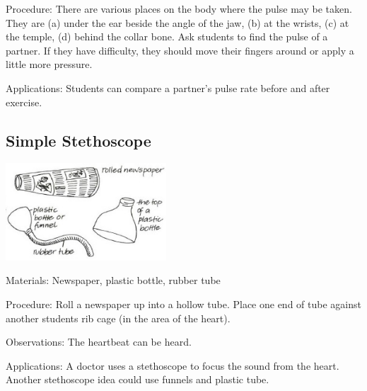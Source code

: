 \begin{multicols}{2}
\begin{description*}
\item[Procedure:]{There are various places on the body where the pulse may be taken.
They are (a) under the ear beside the angle of the jaw, (b) at the wrists,
(c) at the temple, (d) behind the collar bone.
Ask students to find the pulse of a partner. If they have difficulty, they
should move their fingers around or apply a little more pressure.}
\item[Applications:]{Students can compare a partner's pulse rate before and after exercise.}
\end{description*}

\subsection{Simple Stethoscope} %

\begin{center}
\includegraphics[width=0.45\textwidth]{./img/vso/stethoscope.jpg}
\end{center}

\begin{description*}
\item[Materials:]{Newspaper, plastic bottle, rubber tube}
\item[Procedure:]{Roll a newspaper up into a hollow tube. Place one end of tube against another students rib
cage (in the area of the heart).}
\item[Observations:]{The heartbeat can be heard.}
\item[Applications:]{A doctor uses a stethoscope to focus the sound from the heart. Another stethoscope idea
could use funnels and plastic tube.}
\end{description*}


\end{multicols}
